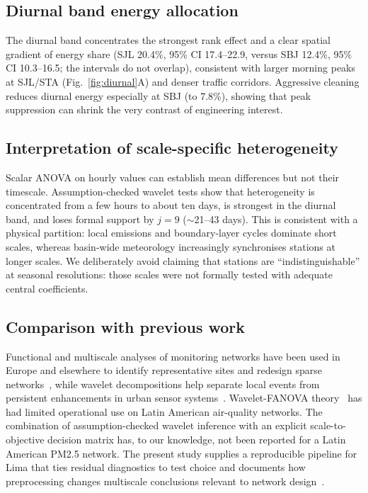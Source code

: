 \documentclass[12pt,letterpaper]{article}
\begin{document}
\subsection{Diurnal band energy allocation}
\label{subsec:diurnal_energy}

The diurnal band concentrates the strongest rank effect and a clear spatial gradient of energy share (SJL 20.4\%, 95\% CI 17.4--22.9, versus SBJ 12.4\%, 95\% CI 10.3--16.5; the intervals do not overlap), consistent with larger morning peaks at SJL/STA (Fig.~\ref{fig:diurnal}A) and denser traffic corridors. Aggressive cleaning reduces diurnal energy especially at SBJ (to 7.8\%), showing that peak suppression can shrink the very contrast of engineering interest.

\subsection{Interpretation of scale-specific heterogeneity}

Scalar ANOVA on hourly values can establish mean differences but not their timescale. Assumption-checked wavelet tests show that heterogeneity is concentrated from a few hours to about ten days, is strongest in the diurnal band, and loses formal support by $j=9$ ($\sim$21--43 days). This is consistent with a physical partition: local emissions and boundary-layer cycles dominate short scales, whereas basin-wide meteorology increasingly synchronises stations at longer scales. We deliberately avoid claiming that stations are ``indistinguishable'' at seasonal resolutions: those scales were not formally tested with adequate central coefficients.

\subsection{Comparison with previous work}

Functional and multiscale analyses of monitoring networks have been used in Europe and elsewhere to identify representative sites and redesign sparse networks~\cite{ignaccolo2008,gouveia2015}, while wavelet decompositions help separate local events from persistent enhancements in urban sensor systems~\cite{zimmerman2020}. Wavelet-FANOVA theory~\cite{ma2018} has had limited operational use on Latin American air-quality networks. The combination of assumption-checked wavelet inference with an explicit scale-to-objective decision matrix has, to our knowledge, not been reported for a Latin American PM2.5 network. The present study supplies a reproducible pipeline for Lima that ties residual diagnostics to test choice and documents how preprocessing changes multiscale conclusions relevant to network design~\cite{pacsi2016,campos2024}.
\end{document}
